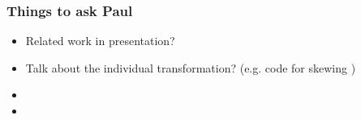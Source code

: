 \documentclass{beamer}
\begin{document}
\begin{frame}
\frametitle{Things to ask Paul}

\begin{itemize}
	\item Related work in presentation?
	\item Talk about the individual transformation? (e.g. code for skewing \Sadey)
	\item 
	\item 
\end{itemize}
\end{frame}



%
\end{document}
